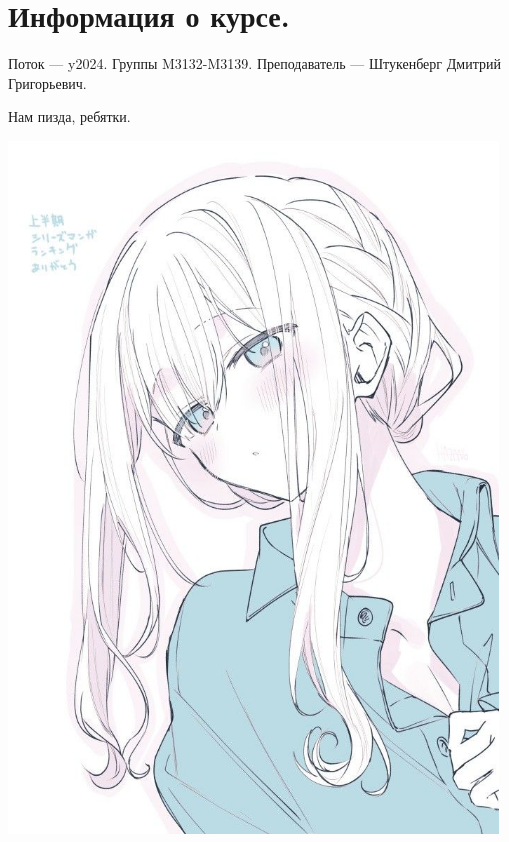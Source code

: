\section{Информация о курсе.}
Поток — y2024.\newline
Группы M3132-M3139.\newline
Преподаватель --- Штукенберг Дмитрий Григорьевич.\par

Нам пизда, ребятки.
\begin{center}
   \includegraphics[width=13cm]{assets/girl.jpg}
\end{center}